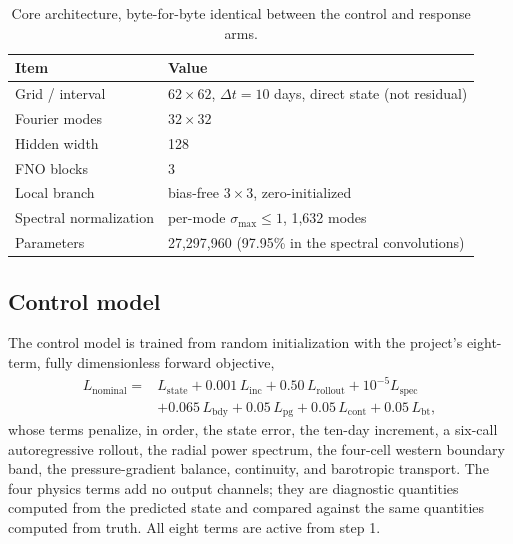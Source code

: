 \documentclass[3p,12pt]{elsarticle}
\newcommand{\FNO}{FNO}
\begin{document}
\begin{table}[H]
\centering
\begin{tabular}{ll}
\toprule
Item & Value \\
\midrule
Grid / interval & $62\times62$, $\Delta t=10$ days, direct state (not residual) \\
Fourier modes & $32\times32$ \\
Hidden width & 128 \\
\FNO{} blocks & 3 \\
Local branch & bias-free $3\times3$, zero-initialized \\
Spectral normalization & per-mode $\sigma_{\max}\le1$, 1{,}632 modes \\
Parameters & 27{,}297{,}960 (97.95\% in the spectral convolutions) \\
\bottomrule
\end{tabular}
\caption{Core architecture, byte-for-byte identical between the control and
response arms.}
\label{tab:arch}
\end{table}

\subsection{Control model}
\label{sec:control}

The control model is trained from random initialization with the project's
eight-term, fully dimensionless forward objective,
\begin{equation}
\begin{split}
L_{\mathrm{nominal}} = {}& L_{\mathrm{state}} + 0.001\,L_{\mathrm{inc}}
+ 0.50\,L_{\mathrm{rollout}} + 10^{-5}L_{\mathrm{spec}}\\
&+ 0.065\,L_{\mathrm{bdy}} + 0.05\,L_{\mathrm{pg}}
+ 0.05\,L_{\mathrm{cont}} + 0.05\,L_{\mathrm{bt}},
\end{split}
\label{eq:nominal}
\end{equation}
whose terms penalize, in order, the state error, the ten-day increment, a
six-call autoregressive rollout, the radial power spectrum, the four-cell western
boundary band, the pressure-gradient balance, continuity, and barotropic
transport. The four physics terms add no output channels; they are diagnostic
quantities computed from the predicted state and compared against the same
quantities computed from truth. All eight terms are active from step 1.
\end{document}
